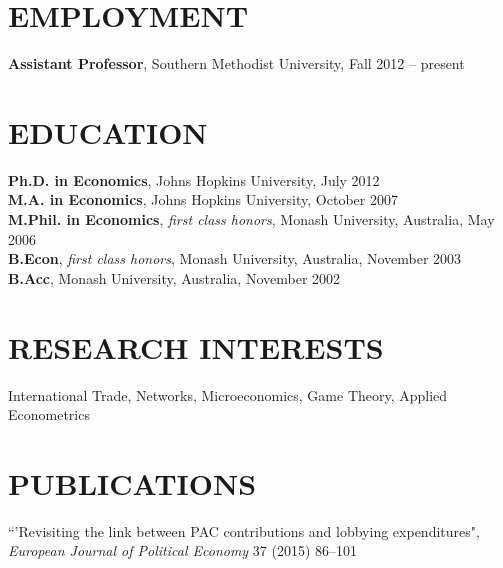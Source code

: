 \documentclass[11pt]{res}
\begin{document}
\begin{resume}
\hspace{-0.5in}\makebox[6.1in]{\hrulefill}

\section{EMPLOYMENT} \vspace{1.5mm}
{\bf Assistant Professor}, Southern Methodist University, Fall 2012 -- present

\section{EDUCATION} \vspace{1.5mm}
    {\bf Ph.D. in Economics}, Johns Hopkins University, July 2012 \vspace{.5mm}\\
    {\bf M.A. in Economics}, Johns Hopkins University, October 2007\vspace{1.5mm}\\
    {\bf M.Phil. in Economics}, \emph{first class honors}, Monash University, Australia, May 2006\vspace{1.5mm}\\
    {\bf B.Econ}, \emph{first class honors}, Monash University, Australia, November 2003\vspace{1.5mm}\\
    {\bf B.Acc}, Monash University, Australia, November 2002


\section{RESEARCH INTERESTS}\vspace{1.5mm}
International Trade, Networks, Microeconomics, Game Theory, Applied Econometrics

\section{PUBLICATIONS}\vspace{1.5mm}
{``'Revisiting the link between PAC contributions and lobbying expenditures", \emph{European Journal of Political Economy}} 37 (2015) 86--101 \vspace{1.5mm}


\end{resume}
\end{document}
